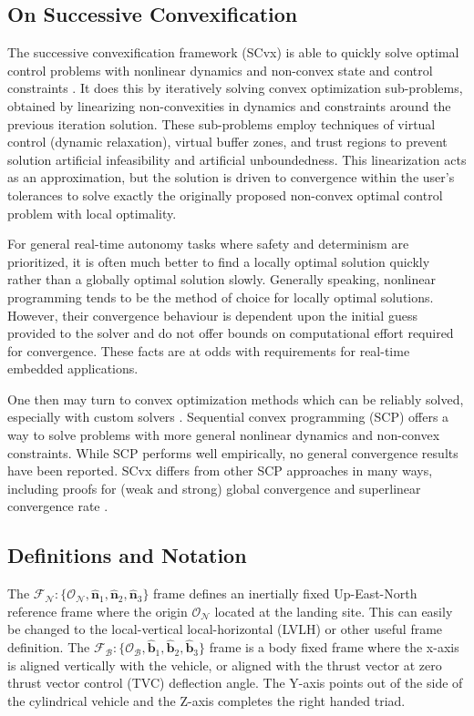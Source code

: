 \documentclass[conf]{new-aiaa}
\begin{document}
\subsection{On Successive Convexification}
The successive convexification framework (SCvx) is able to quickly solve optimal control problems with nonlinear dynamics and non-convex state and control constraints \cite{szmuk2018successive}. It does this by iteratively solving convex optimization sub-problems, obtained by linearizing non-convexities in dynamics and constraints around the previous iteration solution. These sub-problems employ techniques of virtual control (dynamic relaxation), virtual buffer zones, and trust regions to prevent solution artificial infeasibility and artificial unboundedness. This linearization acts as an approximation, but the solution is driven to convergence within the user's tolerances to solve exactly the originally proposed non-convex optimal control problem with local optimality.

For general real-time autonomy tasks where safety and determinism are prioritized, it is often much better to find a locally optimal solution quickly rather than a globally optimal solution slowly. Generally speaking, nonlinear programming tends to be the method of choice for locally optimal solutions. However, their convergence behaviour is dependent upon the initial guess provided to the solver and do not offer bounds on computational effort required for convergence. These facts are at odds with requirements for real-time embedded applications.

One then may turn to convex optimization methods which can be reliably solved, especially with custom solvers \cite{dueri2014automated}. Sequential convex programming (SCP) offers a way to solve problems with more general nonlinear dynamics and non-convex constraints. While SCP performs well empirically, no general convergence results have been reported. SCvx differs from other SCP approaches in many ways, including proofs for (weak and strong) global convergence and superlinear convergence rate \cite{mao2016successive}.

\subsection{Definitions and Notation}
The $\mathcal{F}_\mathcal{N} : \{\mathcal{O}_\mathcal{N}, \hat{\bm{n}}_1, \hat{\bm{n}}_2, \hat{\bm{n}}_3 \}$ frame defines an inertially fixed Up-East-North reference frame where the origin $\mathcal{O}_\mathcal{N}$ located at the landing site. This can easily be changed to the local-vertical local-horizontal (LVLH) or other useful frame definition. The $\mathcal{F}_\mathcal{B}: \{\mathcal{O}_\mathcal{B}, \hat{\bm{b}}_1, \hat{\bm{b}}_2, \hat{\bm{b}}_3 \}$ frame is a body fixed frame where the x-axis is aligned vertically with the vehicle, or aligned with the thrust vector at zero thrust vector control (TVC) deflection angle. The Y-axis points out of the side of the cylindrical vehicle and the Z-axis completes the right handed triad.
\end{document}
